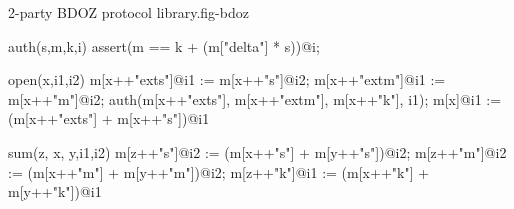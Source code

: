 \begin{fpfig}[t]{2-party BDOZ protocol library.}{fig-bdoz}
{\footnotesize{
\begin{verbatimtab}
auth(s,m,k,i) { assert(m == k + (m["delta"] * s))@i; }

open(x,i1,i2){
  m[x++"exts"]@i1 := m[x++"s"]@i2;
  m[x++"extm"]@i1 := m[x++"m"]@i2;
  auth(m[x++"exts"], m[x++"extm"], m[x++"k"], i1);
  m[x]@i1 := (m[x++"exts"] + m[x++"s"])@i1
}
  
sum(z, x, y,i1,i2) {
  m[z++"s"]@i2 := (m[x++"s"] + m[y++"s"])@i2;
  m[z++"m"]@i2 := (m[x++"m"] + m[y++"m"])@i2;
  m[z++"k"]@i1 := (m[x++"k"] + m[y++"k"])@i1
}
\end{verbatimtab}
}}
\end{fpfig}

\begin{comment}

\begin{fpfig}[t]{2-Party BDOZ Protocol Library.}{fig-bdoz}
{\footnotesize{
  \begin{verbatimtab}
    macsum(s1,s2)
    { { share = s1.share + s2.share; mac = s1.mac + s2.mac } }
    
    maccsum(s,c)
    { { share = s.share + c; mac = s.mac + c } }
    
    macctimes(s,c)
    { { share = s.share * c; mac = s.mac * c } }
    
    macshare(w) { {  share = m[w]; mac = m[w++"mac"] } }

    mack(w) { m[w++"k"] }
    
    auth(s,m,k,i) { assert(m = k + m["delta"] * s)@i }
    
    secopen(w1,w2,w3,i1,i2)
    {
      let locsum =  macsum(macshare(w1), macshare(w2)) in
      m[w3++"s"]@i1 := (locsum.share)@i2;
      m[w3++"smac"]@i1 := (locsum.mac)@i2;
      auth(m[w3++"s"],m[w3++"smac"],mack(w1) + mack(w2),i1);
      m[w3]@i1 := (m[w3++"s"] + (locsum.share))@i1
    }

    secreveal(s,k,w,i1,i2)
    {
      p[w] = s.share@i2;
      p[w++"mac"] = s.mac@i2;
      auth(p[w],p[w++"mac"],k,i1)    
    } \end{verbatimtab}
}}
\end{fpfig}

\end{comment}
    
